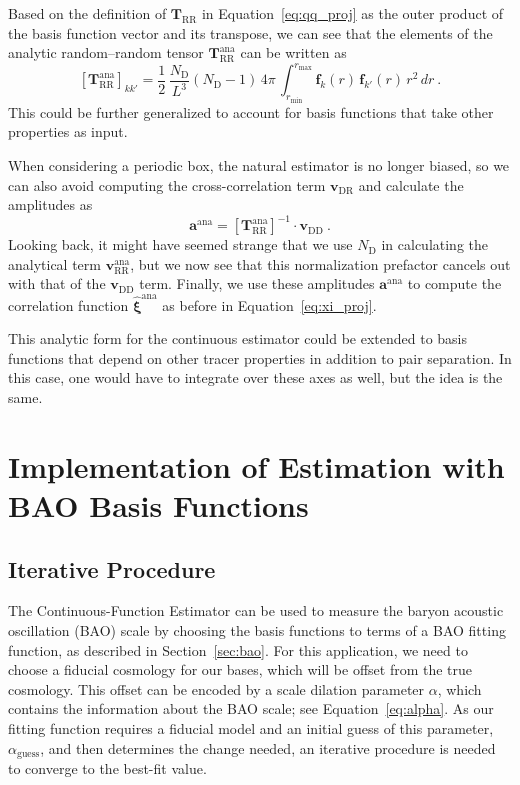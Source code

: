 \documentclass[modern]{aastex62}
\newcommand{\Est}{The Continuous-Function Estimator\xspace}
\newcommand{\inv}{^{-1}}
\newcommand{\bld}[1]{\bm{#1}} %
\newcommand{\vv}[1]{\bld{v}_\mathrm{#1}}
\newcommand{\TT}[1]{\bld{T}_\mathrm{#1}}
\newcommand{\ff}{\bld{f}}
\newcommand{\NN}[1]{N_\mathrm{#1}}
\begin{document}
Based on the definition of $\TT{RR}$ in Equation~\ref{eq:qq_proj} as the outer product of the basis function vector and its transpose, we can see that the elements of the analytic random--random tensor $\TT{RR}^\mathrm{ana}$ can be written as
\begin{equation}
\left[ \TT{RR}^\mathrm{ana} \right]_{kk'} = \frac{1}{2} \, \frac{\NN{D}}{L^3} (\NN{D}-1) \, 4\pi \, \int_{r_\mathrm{min}}^{r_\mathrm{max}} \ff_k(r) \, \ff_{k'}(r) \, r^2 \, dr ~.
\end{equation}
This could be further generalized to account for basis functions that take other properties as input.

When considering a periodic box, the natural estimator is no longer biased, so we can also avoid computing the cross-correlation term $\vv{DR}$ and calculate the amplitudes as 
\begin{equation}
\bld{a}^{\mathrm{ana}} = \left[ \TT{RR}^\mathrm{ana} \right]\inv \cdot \vv{DD} ~.
\end{equation}
Looking back, it might have seemed strange that we use $\NN{D}$ in calculating the analytical term $\vv{RR}^\mathrm{ana}$, but we now see that this normalization prefactor cancels out with that of the $\vv{DD}$ term.
Finally, we use these amplitudes $\bld{a}^{\mathrm{ana}}$ to compute the correlation function $\bld{\hat{\xi}}^{\mathrm{ana}}$ as before in Equation~\ref{eq:xi_proj}.

This analytic form for the continuous estimator could be extended to basis functions that depend on other tracer properties in addition to pair separation.
In this case, one would have to integrate over these axes as well, but the idea is the same.


\section{Implementation of Estimation with BAO Basis Functions}\label{sec:baoiter}

\subsection{Iterative Procedure}

\Est can be used to measure the baryon acoustic oscillation (BAO) scale by choosing the basis functions to terms of a BAO fitting function, as described in Section~\ref{sec:bao}.
For this application, we need to choose a fiducial cosmology for our bases, which will be offset from the true cosmology.
This offset can be encoded by a scale dilation parameter $\alpha$, which contains the information about the BAO scale; see Equation~\ref{eq:alpha}. 
As our fitting function requires a fiducial model and an initial guess of this parameter, $\alpha_\mathrm{guess}$, and then determines the change needed, an iterative procedure is needed to converge to the best-fit value.
\end{document}

